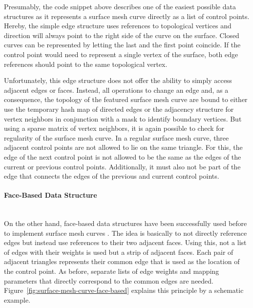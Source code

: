 \documentclass{stdlocal}
\begin{document}
  Presumably, the code snippet above describes one of the easiest possible data structures as it represents a surface mesh curve directly as a list of control points.
  Hereby, the simple edge structure uses references to topological vertices and direction will always point to the right side of the curve on the surface.
  Closed curves can be represented by letting the last and the first point coincide.
  If the control point would need to represent a single vertex of the surface, both edge references should point to the same topological vertex.

  Unfortunately, this edge structure does not offer the ability to simply access adjacent edges or faces.
  Instead, all operations to change an edge and, as a consequence, the topology of the featured surface mesh curve are bound to either use the temporary hash map of directed edges or the adjacency structure for vertex neighbors in conjunction with a mask to identify boundary vertices.
  But using a sparse matrix of vertex neighbors, it is again possible to check for regularity of the surface mesh curve.
  In a regular surface mesh curve, three adjacent control points are not allowed to lie on the same triangle.
  For this, the edge of the next control point is not allowed to be the same as the edges of the current or previous control points.
  Additionally, it must also not be part of the edge that connects the edges of the previous and current control points.

  \paragraph{Face-Based Data Structure}\hfill\\
  On the other hand, face-based data structures have been successfully used before to implement surface mesh curves \autocite{mancinelli2022}.
  The idea is basically to not directly reference edges but instead use references to their two adjacent faces.
  Using this, not a list of edges with their weights is used but a strip of adjacent faces.
  Each pair of adjacent triangles represents their common edge that is used as the location of the control point.
  As before, separate lists of edge weights and mapping parameters that directly correspond to the common edges are needed.
  Figure~\ref{fig:surface-mesh-curve-face-based} explains this principle by a schematic example.
\end{document}
